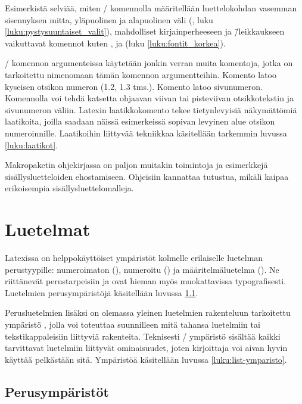 Esimerkistä selviää, miten \-/ komennolla
määritellään luettelokohdan vasemman sisennyksen mitta, yläpuolinen ja
alapuolinen väli (, luku
\ref{luku:pystysuuntaiset_valit}), mahdolliset kirjainperheeseen ja
\=/leikkaukseen vaikuttavat komennot kuten ,
 ja  (luku \ref{luku:fontit_korkea}).

\-/ komennon argumenteissa käytetään jonkin
verran muita komentoja, jotka on tarkoitettu nimenomaan tämän komennon
argumentteihin. Komento  latoo kyseisen
otsikon numeron (1.2, 1.3 tms.). Komento  latoo
sivunumeron. Komennolla  voi tehdä katsetta ohjaavan
viivan tai pisteviivan otsikkotekstin ja sivunumeron väliin. Latexin
laatikkokomento  tekee tietynlevyisiä näkymättömiä
laatikoita, joilla saadaan näissä esimerkeissä sopivan levyinen alue
otsikon numeroinnille. Laatikoihin liittyvää tekniikkaa käsitellään
tarkemmin luvussa \ref{luku:laatikot}.

Makropaketin  ohjekirjassa on paljon muitakin
toimintoja ja esimerkkejä sisällysluetteloiden ehostamiseen. Ohjeisiin
kannattaa tutustua, mikäli kaipaa erikoisempia sisällysluettelomalleja.

\section{Luetelmat}
\label{luku:luetelmat}

Latexissa on helppokäyttöiset ympäristöt kolmelle erilaiselle luetelman
perustyypille: numeroimaton (), numeroitu
() ja määritelmäluetelma ().
Ne riittänevät perustarpeisiin ja ovat hieman myös muokattavissa
typografisesti. Luetelmien perusympäristöjä käsitellään luvussa
\ref{luku:luetelma_perus}.

Perusluetelmien lisäksi on olemassa yleinen luetelmien rakenteluun
tarkoitettu ympäristö , jolla voi toteuttaa suunnilleen
mitä tahansa luetelmiin tai tekstikappaleisiin liittyviä rakenteita.
Teknisesti \-/ ympäristö sisältää kaikki tarvittavat
luetelmiin liittyvät ominaisuudet, joten kirjoittaja voi aivan hyvin
käyttää pelkästään sitä. Ympäristöä käsitellään luvussa
\ref{luku:list-ymparisto}.

\subsection{Perusympäristöt}
\label{luku:luetelma_perus}

